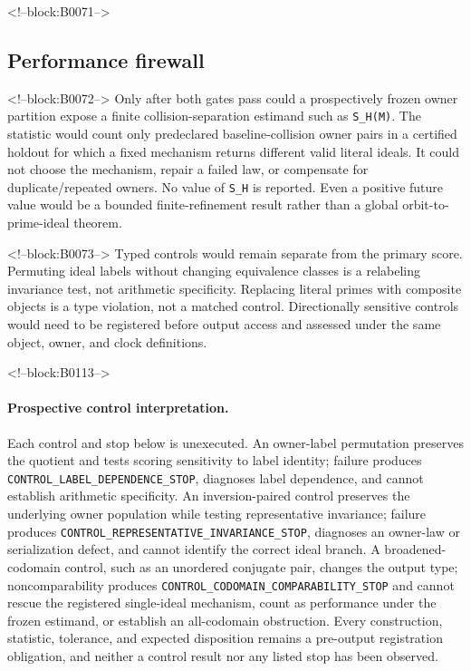 \documentclass[11pt,a4paper]{article}
\begin{document}
<!--block:B0071-->
\subsection{Performance firewall}

<!--block:B0072-->
Only after both gates pass could a prospectively frozen owner partition expose a finite collision-separation estimand such as \texttt{S\_H(M)}. The statistic would count only predeclared baseline-collision owner pairs in a certified holdout for which a fixed mechanism returns different valid literal ideals. It could not choose the mechanism, repair a failed law, or compensate for duplicate/repeated owners. No value of \texttt{S\_H} is reported. Even a positive future value would be a bounded finite-refinement result rather than a global orbit-to-prime-ideal theorem.

<!--block:B0073-->
Typed controls would remain separate from the primary score. Permuting ideal labels without changing equivalence classes is a relabeling invariance test, not arithmetic specificity. Replacing literal primes with composite objects is a type violation, not a matched control. Directionally sensitive controls would need to be registered before output access and assessed under the same object, owner, and clock definitions.

<!--block:B0113-->
\begingroup\sloppy
\paragraph{Prospective control interpretation.} Each control and stop below is unexecuted. An owner-label permutation preserves the quotient and tests scoring sensitivity to label identity; failure produces \texttt{CONTROL\_\allowbreak{}LABEL\_\allowbreak{}DEPENDENCE\_\allowbreak{}STOP}, diagnoses label dependence, and cannot establish arithmetic specificity. An inversion-paired control preserves the underlying owner population while testing representative invariance; failure produces \texttt{CONTROL\_REPRESENTATIVE\_INVARIANCE\_STOP}, diagnoses an owner-law or serialization defect, and cannot identify the correct ideal branch. A broadened-codomain control, such as an unordered conjugate pair, changes the output type; noncomparability produces \texttt{CONTROL\_CODOMAIN\_COMPARABILITY\_STOP} and cannot rescue the registered single-ideal mechanism, count as performance under the frozen estimand, or establish an all-codomain obstruction. Every construction, statistic, tolerance, and expected disposition remains a pre-output registration obligation, and neither a control result nor any listed stop has been observed.\par\endgroup
\end{document}
